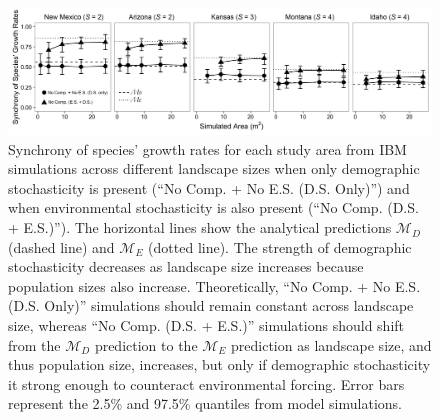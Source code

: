 \documentclass[12pt,]{article}
\begin{document}
\begin{figure}[!ht]
  \centering
      \includegraphics[width=6in]{./components/formatted_figures/formatted_figure2.png}
  \caption{Synchrony of species' growth rates for each study area from IBM simulations across different landscape sizes when only demographic stochasticity is present (``No Comp. + No E.S. (D.S. Only)'') and when environmental stochasticity is also present (``No Comp. (D.S. + E.S.)''). The horizontal lines show the analytical predictions $\mathcal{M}_D$ (dashed line) and $\mathcal{M}_E$ (dotted line). The strength of demographic stochasticity decreases as landscape size increases because population sizes also increase. Theoretically, ``No Comp. + No E.S. (D.S. Only)'' simulations should remain constant across landscape size, whereas ``No Comp. (D.S. + E.S.)'' simulations should shift from the $\mathcal{M}_D$ prediction to the $\mathcal{M}_E$ prediction as landscape size, and thus population size, increases, but only if demographic stochasticity it strong enough to counteract environmental forcing. Error bars represent the 2.5\% and 97.5\% quantiles from model simulations.}
\end{figure}

\pagebreak{}
\end{document}
